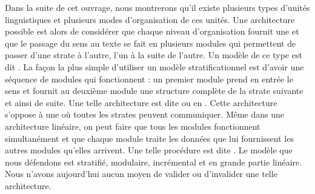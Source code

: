 Dans la suite de cet ouvrage, nous montrerons qu’il existe plusieurs types d’unités linguistiques et plusieurs modes d’organisation de ces unités. Une architecture possible est alors de considérer que chaque niveau d’organisation fournit une  et que le passage du sens au texte se fait en plusieurs modules qui permettent de passer d’une strate à l’autre, l’un à la suite de l’autre. Un modèle de ce type est dit . La façon la plus simple d’utiliser un modèle stratificationnel est d’avoir une séquence de modules qui fonctionnent   : un premier module prend en entrée le sens et fournit au deuxième module une structure complète de la strate suivante et ainsi de suite. Une telle architecture est dite  ou en . Cette architecture s’oppose à une  où toutes les strates peuvent communiquer. Même dans une architecture linéaire, on peut faire que tous les modules fonctionnent simultanément et que chaque module traite les données que lui fournissent les autres modules  qu’elles arrivent. Une telle procédure est dite . Le modèle que nous défendons est stratifié, modulaire, incrémental et en grande partie linéaire. Nous n’avons aujourd’hui aucun moyen de valider ou d’invalider une telle architecture.


